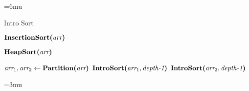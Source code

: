\begin{algorithm}[H]
	\unboldmath
	\thinmuskip=6mu
	\caption{Intro Sort}
	\begin{algorithmic}[1]
		
		\State
		  \label{line:insertion-sort}
			\State $\textbf{InsertionSort(}\textit{arr}\textbf{)}$
		
		\State
		  \label{line:heap-sort}
		\State $\textbf{HeapSort(}\textit{arr}\textbf{)}$
		
		\State
		\Else {} \label{line:quick-sort}
			\State $\textit{arr}_1, \textit{arr}_2 \gets \textbf{Partition(}\textit{arr}\textbf{)}$
			\State $\textbf{IntroSort(}\textit{arr}_1, \textit{depth-1}\textbf{)}$
			\State $\textbf{IntroSort(}\textit{arr}_2, \textit{depth-1}\textbf{)}$
		\EndIf
		
		\State
		\EndProcedure
	\end{algorithmic}
	\boldmath
	\thinmuskip=3mu
	\label{pseudocode:intro-sort}
\end{algorithm}
